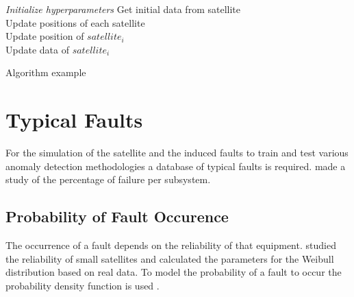 \begin{algorithm}
	
	
	
	\Indm
	\Indp
	
	\BlankLine
	
	\emph{Initialize hyperparameters}\;
	Get initial data from satellite\\
	Update positions of each satellite\\
	Update position of $satellite_i$\\
	Update data of $satellite_i$
	
	\caption[Do not end short caption with full-stop]{Algorithm example}
	\label{alg}
	
\end{algorithm}


\section{Typical Faults}
For the simulation of the satellite and the induced faults to train and test various anomaly detection methodologies a database of typical faults is required. \textcite{tafazoli2009study} made a study of the percentage of failure per subsystem. 

\subsection{Probability of Fault Occurence}
The occurrence of a fault depends on the reliability of that equipment. \textcite{Guo2014} studied the reliability of small satellites and calculated the parameters for the Weibull distribution based on real data. To model the probability of a fault to occur the probability density function is used \cite{Jones2017}.


